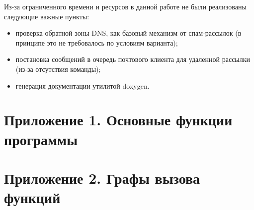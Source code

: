 \documentclass[a4paper,12pt]{report}
\begin{document}
Из-за ограниченного времени и ресурсов в данной работе не были реализованы следующие важные пункты:
\begin{itemize}
    \item проверка обратной зоны DNS, как базовый механизм от спам-рассылок (в принципе это не требовалось по условиям варианта);
    \item постановка сообщений в очередь почтового клиента для удаленной рассылки (из-за отсутствия команды);
    \item генерация документации утилитой doxygen.
\end{itemize}


\cleardoublepage
{}
{}
\chapter*{Приложение 1. Основные функции программы}


% 

% 
% 
% 
% 
% 
% 
% 
% 
% 
% 


\cleardoublepage
{}
{}
\chapter*{Приложение 2. Графы вызова функций}




\end{document}
